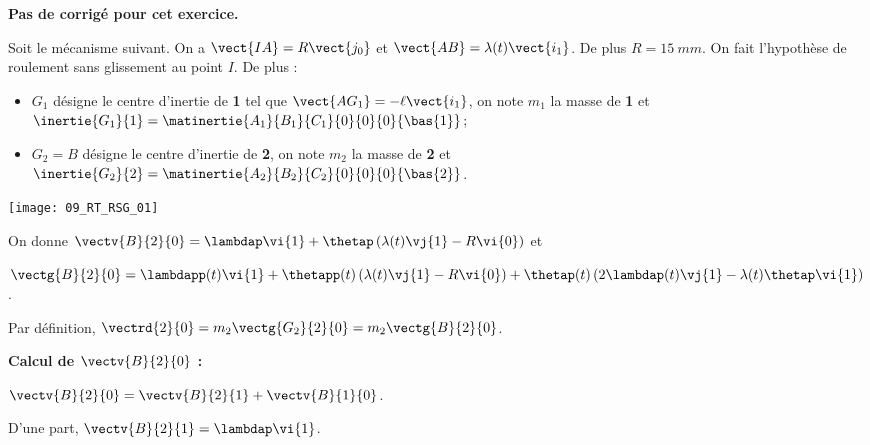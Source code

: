 \normalfalse \difficiletrue \tdifficilefalse
\correctiontrue


\setcounter{numques}{0}
\ifcorrection
\else
\textbf{Pas de corrigé pour cet exercice.}
\fi

\ifprof
\else
Soit le mécanisme suivant. On a $\vect{IA}=R\vect{j_0}$ et $\vect{AB}=\lambda(t)\vect{i_1}$. De plus $R=\SI{15}{mm}$.
On fait l'hypothèse de roulement sans glissement au point $I$. De plus :
\begin{itemize}
\item $G_1$ désigne le centre d'inertie de \textbf{1} tel que $\vect{AG_1}=-\ell\vect{i_1}$, on note $m_1$ la masse de \textbf{1} et $\inertie{G_1}{1}=\matinertie{A_1}{B_1}{C_1}{0}{0}{0}{\bas{1}}$; 
\item $G_2=B$ désigne le centre d'inertie de \textbf{2}, on note $m_2$ la masse de \textbf{2} et $\inertie{G_2}{2}=\matinertie{A_2}{B_2}{C_2}{0}{0}{0}{\bas{2}}$.
\end{itemize}
\begin{center}
\texttt{[image: 09\_RT\_RSG\_01]}
\end{center}

On donne  $\vectv{B}{2}{0} = \lambdap\vi{1} + \thetap\left(\lambda(t)\vj{1}-R\vi{0} \right)$
et

$\vectg{B}{2}{0}  = \lambdapp(t)\vi{1} %
+ \thetapp(t)\left(\lambda(t)\vj{1}-R\vi{0} \right)
+ \thetap(t)\left(2\lambdap(t)\vj{1}-\lambda(t)\thetap\vi{1} \right)
$.


\fi



\ifprof

Par définition, $\vectrd{2}{0} =  m_2 \vectg{G_2}{2}{0}=  m_2 \vectg{B}{2}{0}$.

\vspace{.5cm}

\textbf{Calcul de $ \vectv{B}{2}{0}$ :}

$\vectv{B}{2}{0}=\vectv{B}{2}{1}+\vectv{B}{1}{0}$.

D'une part,  $\vectv{B}{2}{1}=\lambdap\vi{1}$.

